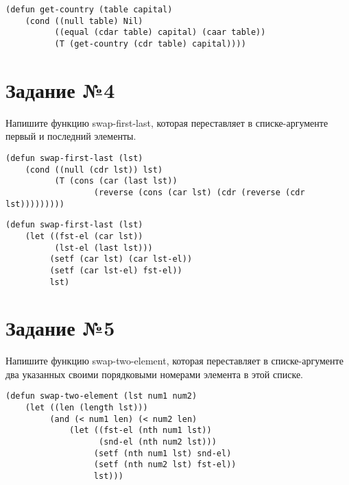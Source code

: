 \vspace{4mm}
\begin{minipage}{0.92\linewidth}
\begin{lstlisting}
(defun get-country (table capital)
    (cond ((null table) Nil)
          ((equal (cdar table) capital) (caar table))
          (T (get-country (cdr table) capital))))
\end{lstlisting}
\end{minipage}

\section{Задание №4}

Напишите функцию swap-first-last, которая переставляет в списке-аргументе
первый и последний элементы.

\vspace{4mm}
\begin{minipage}{0.92\linewidth}
\begin{lstlisting}
(defun swap-first-last (lst)
    (cond ((null (cdr lst)) lst)
          (T (cons (car (last lst))
                  (reverse (cons (car lst) (cdr (reverse (cdr lst)))))))))
\end{lstlisting}
\end{minipage}

\vspace{4mm}
\begin{minipage}{0.92\linewidth}
\begin{lstlisting}
(defun swap-first-last (lst)
    (let ((fst-el (car lst))
          (lst-el (last lst)))
         (setf (car lst) (car lst-el))
         (setf (car lst-el) fst-el))
         lst)
\end{lstlisting}
\end{minipage}

\section{Задание №5}

Напишите функцию swap-two-element, которая переставляет в списке-аргументе
два указанных своими порядковыми номерами элемента в этой списке.

\vspace{4mm}
\begin{minipage}{0.92\linewidth}
\begin{lstlisting}
(defun swap-two-element (lst num1 num2)
    (let ((len (length lst)))
         (and (< num1 len) (< num2 len)
             (let ((fst-el (nth num1 lst))
                   (snd-el (nth num2 lst)))
                  (setf (nth num1 lst) snd-el)
                  (setf (nth num2 lst) fst-el))
                  lst)))
\end{lstlisting}
\end{minipage}

